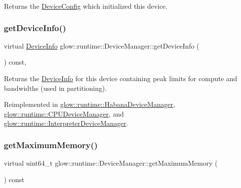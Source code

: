 \begin{DoxyReturn}{Returns}
the \hyperlink{structglow_1_1runtime_1_1_device_config}{Device\+Config} which initialized this device. 
\end{DoxyReturn}
\mbox{\label{classglow_1_1runtime_1_1_device_manager_aaf319fc3b9aa67c5e053bdf690e89d34}} 
\subsubsection{\texorpdfstring{get\+Device\+Info()}{getDeviceInfo()}}
{\footnotesize\ttfamily virtual \hyperlink{structglow_1_1runtime_1_1_device_info}{Device\+Info} glow\+::runtime\+::\+Device\+Manager\+::get\+Device\+Info (\begin{DoxyParamCaption}{ }\end{DoxyParamCaption}) const\hspace{0.3cm}{\ttfamily [inline]}, {\ttfamily [virtual]}}

\begin{DoxyReturn}{Returns}
the \hyperlink{structglow_1_1runtime_1_1_device_info}{Device\+Info} for this device containing peak limits for compute and bandwidths (used in partitioning). 
\end{DoxyReturn}


Reimplemented in \hyperlink{classglow_1_1runtime_1_1_habana_device_manager_a5c73935d669a16b259c37b335caae76d}{glow\+::runtime\+::\+Habana\+Device\+Manager}, \hyperlink{classglow_1_1runtime_1_1_c_p_u_device_manager_af2ab7f66e45a81dd9fe1f2ad4054bc6c}{glow\+::runtime\+::\+C\+P\+U\+Device\+Manager}, and \hyperlink{classglow_1_1runtime_1_1_interpreter_device_manager_a02839dd04dcd6e6c3d768f39c666b67b}{glow\+::runtime\+::\+Interpreter\+Device\+Manager}.

\mbox{\label{classglow_1_1runtime_1_1_device_manager_ad158f1c1f9f32b48927f50d48f80decb}} 
\subsubsection{\texorpdfstring{get\+Maximum\+Memory()}{getMaximumMemory()}}
{\footnotesize\ttfamily virtual uint64\+\_\+t glow\+::runtime\+::\+Device\+Manager\+::get\+Maximum\+Memory (\begin{DoxyParamCaption}{ }\end{DoxyParamCaption}) const\hspace{0.3cm}{\ttfamily [pure virtual]}}

